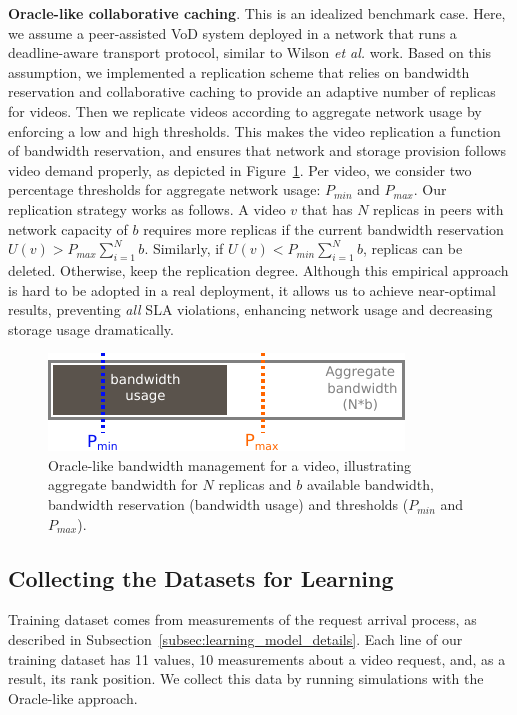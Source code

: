 \noindent
{\bf Oracle-like collaborative caching}. This is an idealized benchmark case. Here, we assume a peer-assisted VoD system deployed in a network that runs a deadline-aware transport protocol, similar to Wilson \emph{et al.}\cite{d3_sigcomm2011} work. Based on this assumption, we implemented a replication scheme that relies on bandwidth reservation and collaborative
caching to provide an adaptive number of replicas for videos. Then we replicate videos according to aggregate network usage by enforcing a low and high thresholds. This makes the video replication a function of bandwidth reservation, and ensures that network and storage provision follows video demand properly, as depicted in Figure~\ref{fig:oracle_like}. Per video, we consider two percentage thresholds for aggregate network usage: $P_{min}$ and $P_{max}$. Our replication strategy works as follows. A video $v$ that has $N$ replicas in peers with network capacity of $b$ requires more replicas if the current bandwidth reservation $U(v) > P_{max} \sum_{i=1}^N b$. Similarly, if $U(v) < P_{min} \sum_{i=1}^N b$, replicas can be deleted. Otherwise, keep the replication degree. Although this empirical approach is hard to be adopted in a real deployment, it allows us to achieve near-optimal results, preventing \emph{all} SLA violations, enhancing network usage and decreasing storage usage dramatically.  

\begin{figure}
  \centering
     \includegraphics[width=.6\textwidth]{inputs/img/oracle_like}
  \caption{Oracle-like bandwidth management for a video, illustrating aggregate bandwidth for $N$ replicas and $b$ available bandwidth, bandwidth reservation (bandwidth usage) and thresholds ($P_{min}$ and $P_{max}$).}
  \label{fig:oracle_like}
\end{figure}


\subsection{Collecting the Datasets for Learning}
\label{subsec:methodology_training_dataset}

Training dataset comes from measurements of the request arrival process, as described in Subsection~\ref{subsec:learning_model_details}. Each line of our training dataset has 11 values, 10 measurements about a video request, and, as a result, its rank position. We collect this data by running simulations with the Oracle-like approach.


